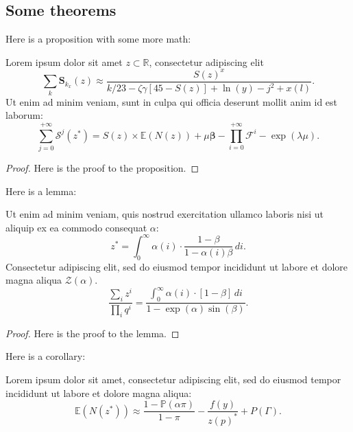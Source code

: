 \documentclass[letterpaper,12pt,leqno]{article}
\begin{document}
\subsection{Some theorems}

Here is a proposition with some more math:   

\begin{proposition}\label{p:type1}  Lorem ipsum dolor sit amet $z \subset \mathbb{R}$, consectetur adipiscing elit
\begin{equation}
\sum_k\bm{S}_{k_x}(z) \approx \frac{S(z)^x}{k / 23 -\zeta\gamma [45- S(z)] + \ln(y) - j^2+x(l)}.
\label{e:type1}\end{equation}
Ut enim ad minim veniam, sunt in culpa qui officia deserunt mollit anim id est laborum:
\begin{equation}
\sum_{j=0}^{+\infty}\mathcal{S}^j(z^{\ast}) = S(z) \times \mathbb{E}(N(z)) + \mathbb{\mu} \bm{\beta} - \prod_{i=0}^{+\infty}\mathcal{F}^{i}-\exp(\lambda \mu).
\label{e:type1steps}\end{equation}
\end{proposition}

\begin{proof} Here is the proof to the proposition.\end{proof} 

Here is a lemma:

\begin{lemma}\label{p:cv} Ut enim ad minim veniam, quis nostrud exercitation ullamco laboris nisi ut aliquip ex ea commodo consequat $\alpha$:
\begin{equation}
z^* = \int_{0}^{\infty} \alpha(i) \cdot \frac{1-\beta}{1-\alpha(i)\beta}\,di.
\label{e:cv}\end{equation}
Consectetur adipiscing elit, sed do eiusmod tempor incididunt ut labore et dolore magna aliqua $\mathcal{Z}(\alpha)$. 
\begin{equation}
\frac{\sum_i z^i}{\prod_i q^i} = \frac{\int_{0}^{\infty} \alpha(i) \cdot [1-\beta]\,di}{1-\exp(\alpha)\sin(\beta)}.
\label{e:cv}\end{equation}
\end{lemma}

\begin{proof} Here is the proof to the lemma.\end{proof} 

Here is a corollary:

\begin{corollary} Lorem ipsum dolor sit amet, consectetur adipiscing elit, sed do eiusmod tempor incididunt ut labore et dolore magna aliqua:
\begin{equation*}
\mathbb{E}(N(z^*)) \approx \frac{1-\mathbb{P}(\alpha\pi)}{1-\pi}- \frac{f(y)}{z(p)^*} + P(\Gamma).
\end{equation*}\end{corollary}
\end{document}
